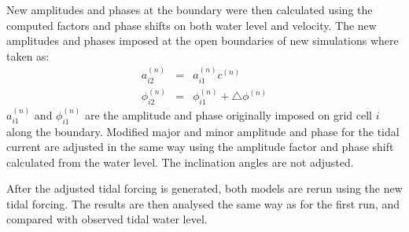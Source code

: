 New amplitudes and phases at the boundary were then calculated using the computed factors and phase shifts on both water level and velocity. The new amplitudes and phases imposed at the open boundaries of new simulations where taken as:
\begin{eqnarray}
a^{(n)}_{i2} &=& a^{(n)}_{i1} c^{(n)} \\
\phi^{(n)}_{i2} &=& \phi^{(n)}_{i1} + \triangle \phi^{(n)}
\end{eqnarray}
$a^{(n)}_{i1}$ and $\phi^{(n)}_{i1}$ are the amplitude and phase originally imposed on grid cell $i$ along the boundary. Modified major and minor amplitude and phase for the tidal current are adjusted in the same way using the amplitude factor and phase shift calculated from the water level. The inclination angles are not adjusted.

After the adjusted tidal forcing is generated, both models are rerun using the new tidal forcing. The results are then analysed the same way as for the first run, and compared with observed tidal water level. 
